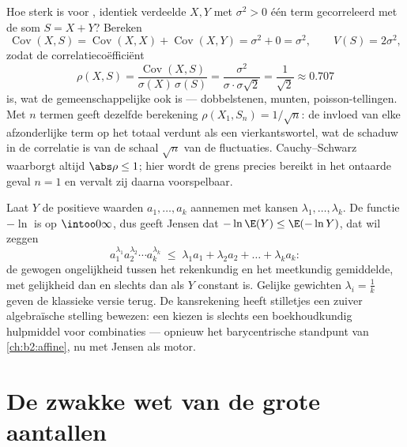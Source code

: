 \begin{example}\label{ex:b2:randomvar:partwhole}
Hoe sterk is voor , identiek verdeelde $X, Y$ met
 $\sigma^2 > 0$ één term gecorreleerd met de som $S = X +
Y$? Bereken
\[
\operatorname{Cov}(X, S) = \operatorname{Cov}(X, X) +
\operatorname{Cov}(X, Y) = \sigma^2 + 0 = \sigma^2,
\qquad V(S) = 2\sigma^2,
\]
zodat de correlatiecoëfficiënt
\[
\rho(X, S) = \frac{\operatorname{Cov}(X,
S)}{\sigma(X)\,\sigma(S)}
= \frac{\sigma^2}{\sigma\cdot\sigma\sqrt2}
= \frac{1}{\sqrt2} \approx 0.707
\]
is, wat de gemeenschappelijke  ook is --- dobbelstenen,
munten, poisson-tellingen. Met $n$ termen geeft dezelfde berekening
$\rho(X_1, S_n) = 1/\sqrt n$: de invloed van elke afzonderlijke
term op het totaal verdunt als een vierkantswortel, wat de schaduw
in de correlatie is van de schaal $\sqrt n$ van de fluctuaties.
Cauchy--Schwarz waarborgt altijd $\abs\rho \leq 1$; hier wordt de
grens precies bereikt in het ontaarde geval $n = 1$ en vervalt zij
daarna voorspelbaar.
\end{example}

\begin{example}\label{ex:b2:randomvar:amgm}
Laat $Y$ de positieve waarden $a_1, \dots, a_k$ aannemen met kansen
$\lambda_1, \dots, \lambda_k$. De functie $-\ln$ is  op
$\intoo0\infty$, dus geeft Jensen dat $-\ln\E(Y) \leq \E(-\ln Y)$,
dat wil zeggen
\[
a_1^{\lambda_1}a_2^{\lambda_2}\cdots a_k^{\lambda_k}
\;\leq\; \lambda_1a_1 + \lambda_2a_2 + \dots + \lambda_ka_k :
\]
de gewogen ongelijkheid tussen het rekenkundig en het meetkundig
gemiddelde, met gelijkheid dan en slechts dan als $Y$ constant is.
Gelijke gewichten $\lambda_i = \frac1k$ geven de klassieke versie
terug. De kansrekening heeft stilletjes een zuiver algebraïsche
stelling bewezen: een  kiezen is slechts een
boekhoudkundig hulpmiddel voor  combinaties --- opnieuw het
barycentrische standpunt van \cref{ch:b2:affine}, nu met Jensen als
motor.
\end{example}

\section{De zwakke wet van de grote aantallen}

